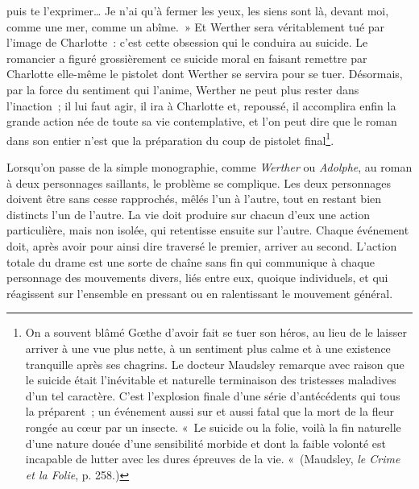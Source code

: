 \documentclass[french,twoside]{book} %
\begin{document}
puis te l’exprimer… Je n’ai qu’à fermer les yeux, les siens sont là, devant moi, comme une mer, comme un abîme. » Et Werther sera véritablement tué par l’image de Charlotte : c’est cette obsession qui le conduira au suicide. Le romancier a figuré grossièrement ce suicide moral en faisant remettre par Charlotte elle-même le pistolet dont Werther se servira pour se tuer. Désormais, par la force du sentiment qui l’anime, Werther ne peut plus rester dans l’inaction ; il lui faut agir, il ira à Charlotte et, repoussé, il accomplira enfin la grande action née de toute sa vie contemplative, et l’on peut dire que le roman dans son entier n’est que la préparation du coup de pistolet final\footnote{ On a souvent blâmé Gœthe d’avoir fait se tuer son héros, au lieu de le laisser arriver à une vue plus nette, à un sentiment plus calme et à une existence tranquille après ses chagrins. Le docteur Maudsley remarque avec raison que le suicide était l’inévitable et naturelle terminaison des tristesses maladives d’un tel caractère. C’est l’explosion finale d’une série d’antécédents qui tous la préparent ; un événement aussi sur et aussi fatal que la mort de la fleur rongée au cœur par un insecte. « Le suicide ou la folie, voilà la fin naturelle d’une nature douée d’une sensibilité morbide et dont la faible volonté est incapable de lutter avec les dures épreuves de la vie. « (Maudsley, \emph{le Crime et la Folie}, p. 258.)}.\par
Lorsqu’on passe de la simple monographie, comme \emph{Werther} ou \emph{Adolphe}, au roman à deux personnages saillants, le problème se complique. Les deux personnages doivent être sans cesse rapprochés, mêlés l’un à l’autre, tout en restant bien distincts l’un de l’autre. La vie doit produire sur chacun d’eux une action particulière, mais non isolée, qui retentisse ensuite sur l’autre. Chaque événement doit, après avoir pour ainsi dire traversé le premier, arriver au second. L’action totale du drame est une sorte de chaîne sans fin qui communique à chaque personnage des mouvements divers, liés entre eux, quoique individuels, et qui réagissent sur l’ensemble en pressant ou en ralentissant le mouvement général.\par
\end{document}
